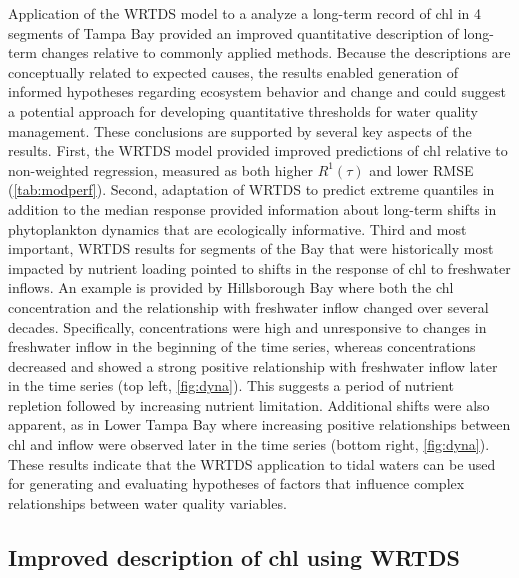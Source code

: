 \documentclass{svjour3}\usepackage[]{graphicx}\usepackage[]{color}
\begin{document}
Application of the \acf{WRTDS} model to a analyze a long-term record of \ac{chl} in 4 segments of Tampa Bay provided an improved quantitative description of long-term changes relative to commonly applied methods.  Because the descriptions are conceptually related to expected causes, the results enabled generation of informed hypotheses regarding ecosystem behavior and change and could suggest a potential approach for developing quantitative thresholds for water quality management.   These conclusions are supported by several key aspects of the results.  First, the \ac{WRTDS} model provided improved predictions of \ac{chl} relative to non-weighted regression, measured as both higher $R^1\left(\tau\right)$ and lower \ac{RMSE} (\cref{tab:modperf}).  Second, adaptation of \ac{WRTDS} to predict extreme quantiles in addition to the median response provided information about long-term shifts in phytoplankton dynamics that are ecologically informative.  Third and most important, \ac{WRTDS} results for segments of the Bay that were historically most impacted by nutrient loading pointed to shifts in the response of \ac{chl} to freshwater inflows.  An example is provided by Hillsborough Bay where both the \ac{chl} concentration and the relationship with freshwater inflow changed over several decades.  Specifically, concentrations were high and unresponsive to changes in freshwater inflow in the beginning of the time series, whereas concentrations decreased and showed a strong positive relationship with freshwater inflow later in the time series (top left, \cref{fig:dyna}).  This suggests a period of nutrient repletion followed by increasing nutrient limitation.  Additional shifts were also apparent, as in Lower Tampa Bay where increasing positive relationships between \ac{chl} and inflow were observed later in the time series (bottom right, \cref{fig:dyna}). These results indicate that the \ac{WRTDS} application to tidal waters can be used for generating and evaluating hypotheses of factors that influence complex relationships between water quality variables.

\subsection{Improved description of \ac{chl} using \ac{WRTDS}}
\end{document}
